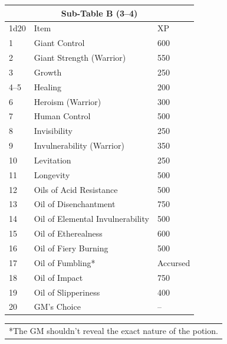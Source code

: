 \begin{multicols}{2}
\noindent
\begin{tabular}{|p{}|p{}|p{}|}
\multicolumn{3}{c}{Sub-Table B (3--4)} \\
\hline
1d20	& Item	& XP \\
\hline\hline
\rowcolor[gray]{.9}1	& Giant Control	& 600 \\
2	& Giant Strength (Warrior)	& 550 \\
\rowcolor[gray]{.9}3	& Growth	& 250 \\
4--5	& Healing	& 200 \\
\rowcolor[gray]{.9}6	& Heroism (Warrior)	& 300 \\
7	& Human Control	& 500 \\
\rowcolor[gray]{.9}8	& Invisibility	& 250 \\
9	& Invulnerability (Warrior)	& 350 \\
\rowcolor[gray]{.9}10	& Levitation	& 250 \\
11	& Longevity	& 500 \\
\rowcolor[gray]{.9}12	& Oils of Acid Resistance	& 500 \\
13	& Oil of Disenchantment	& 750 \\
\rowcolor[gray]{.9}14	& Oil of Elemental Invulnerability	& 500 \\
15	& Oil of Etherealness	& 600 \\
\rowcolor[gray]{.9}16	& Oil of Fiery Burning	& 500 \\
17	& Oil of Fumbling*	& Accursed \\
\rowcolor[gray]{.9}18	& Oil of Impact	& 750 \\
19	& Oil of Slipperiness	& 400 \\
\rowcolor[gray]{.9}20	& GM's Choice	& -- \\
\hline
\end{tabular}
\noindent\begin{tabular}{p{}}
*The GM shouldn't reveal the exact nature of the potion. \\
\end{tabular}\vspace{.5em}


\end{multicols}
